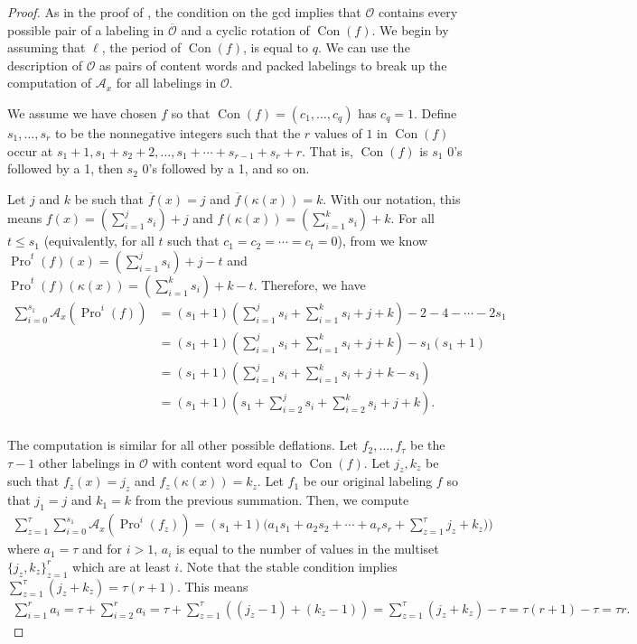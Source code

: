 \documentclass[10pt,a4paper]{amsart}
\DeclareMathOperator{\Con}{\mathrm{Con}}
\DeclareMathOperator{\Pro}{\mathrm{Pro}}
\begin{document}
\begin{proof}
As in the proof of , the condition on the gcd implies that  $\mathcal{O}$ contains every possible pair of a labeling in $\overline{\mathcal{O}}$ and a cyclic rotation of $\Con(f)$. 
We begin by assuming that $\ell$, the period of $\Con(f)$, is equal to $q$.
We can use the description of $\mathcal{O}$ as pairs of content words and packed labelings to break up the computation of $\mathcal{A}_x$ for all labelings in $\mathcal{O}$. 

We assume we have chosen $f$ so that $\Con(f) = (c_1,\ldots,c_q)$ has $c_q = 1$. Define $s_1,\ldots,s_r$ to be the nonnegative integers such that the $r$ values of $1$ in $\Con(f)$ occur at $s_1+1,s_1+s_2 + 2,\ldots,s_1 + \cdots + s_{r-1} + s_r + r$. That is, $\Con(f)$ is $s_1$ 0's followed by a 1, then $s_2$ 0's followed by a 1, and so on.

Let $j$ and $k$ be such that $\overline{f}(x) = j$ and $\overline{f}(\kappa(x)) = k$. With our notation, this means $f(x) = (\sum_{i=1}^j s_i) + j$ and $f(\kappa(x)) = (\sum_{i=1}^k s_i) + k$. For all $t \leq s_1$ (equivalently, for all $t$ such that $c_1 = c_2 = \cdots = c_t = 0$), from  we know $\Pro^t(f)(x) = (\sum_{i=1}^j s_i) + j - t$ and $\Pro^t(f)(\kappa(x)) = (\sum_{i=1}^k s_i) + k - t$.  Therefore, we have
\begin{align*}
\sum_{i=0}^{s_1} \mathcal{A}_x(\Pro^i(f)) &= (s_1 + 1)(\sum_{i=1}^{j} s_i + \sum_{i=1}^{k} s_i + j + k) -2 - 4 - \cdots - 2s_1\\
&= (s_1 + 1)(\sum_{i=1}^{j} s_i + \sum_{i=1}^{k} s_i + j + k) -s_1(s_1+1)\\
& = (s_1 + 1)(\sum_{i=1}^{j} s_i + \sum_{i=1}^{k} s_i + j + k-s_1)\\
& = (s_1 + 1)(s_1 + \sum_{i=2}^{j} s_i + \sum_{i=2}^{k} s_i + j + k).\\
\end{align*}

The computation is similar for all other possible deflations. Let $f_2,\ldots,f_\tau$ be the $\tau-1$ other labelings in $\mathcal{O}$ with content word equal to $\Con(f)$. Let $j_z,k_z$ be such that $f_z(x) = j_z$ and $f_z(\kappa(x)) = k_z$. Let $f_1$ be our original labeling $f$ so that $j_1 = j$ and $k_1 = k$ from the previous summation. Then, we compute
\begin{align}
\sum_{z = 1}^\tau \sum_{i=0}^{s_1} \mathcal{A}_x(\Pro^i(f_z)) = (s_1 + 1)\big(a_1 s_1 + a_2 s_2 + \cdots + a_rs_r + \sum_{z=1}^\tau j_z + k_z)\big)\label{eq:SumFirstSection}
\end{align}
where $a_1 = \tau$ and for $i > 1$, $a_i$ is equal to the number of values in the multiset $\{j_z,k_z\}_{z=1}^r$ which are at least $i$. 
Note that the stable condition implies $\sum_{z=1}^\tau (j_z + k_z) = \tau(r+1)$.  This means \begin{align}
 \sum_{i=1}^r a_i=\tau+\sum_{i=2}^r a_i=\tau+\sum_{z=1}^\tau ((j_z-1)+(k_z-1))=\sum_{z=1}^\tau (j_z+k_z)-\tau= \tau (r+1) - \tau = \tau r.  \label{eq:SimplifySumai} 
\end{align}



\end{proof}
\end{document}
